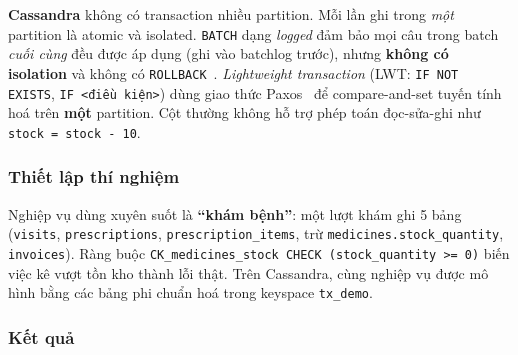 \textbf{Cassandra} không có transaction nhiều partition. Mỗi lần ghi trong \textit{một} partition là atomic và isolated. \texttt{BATCH} dạng \textit{logged} đảm bảo mọi câu trong batch \textit{cuối cùng} đều được áp dụng (ghi vào batchlog trước), nhưng \textbf{không có isolation} và không có \texttt{ROLLBACK}~\cite{cassandra-docs}. \textit{Lightweight transaction} (LWT: \texttt{IF NOT EXISTS}, \texttt{IF <điều kiện>}) dùng giao thức Paxos~\cite{paxos} để compare-and-set tuyến tính hoá trên \textbf{một} partition. Cột thường không hỗ trợ phép toán đọc-sửa-ghi như \texttt{stock = stock - 10}.

\subsubsection{Thiết lập thí nghiệm}
Nghiệp vụ dùng xuyên suốt là \textbf{``khám bệnh''}: một lượt khám ghi 5 bảng (\texttt{visits}, \texttt{prescriptions}, \texttt{prescription\_items}, trừ \texttt{medicines.stock\_quantity}, \texttt{invoices}). Ràng buộc \texttt{CK\_medicines\_stock CHECK (stock\_quantity >= 0)} biến việc kê vượt tồn kho thành lỗi thật. Trên Cassandra, cùng nghiệp vụ được mô hình bằng các bảng phi chuẩn hoá trong keyspace \texttt{tx\_demo}.

\subsubsection{Kết quả}

